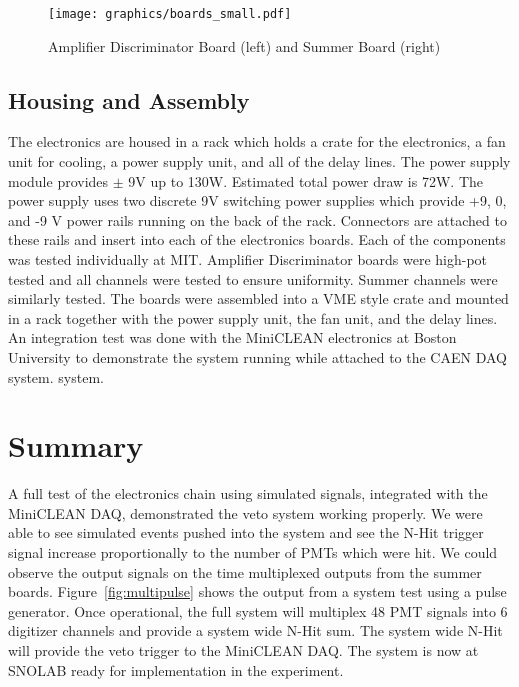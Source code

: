 \documentclass{JINST}
\begin{document}
\begin{figure}[ht]
\begin{center}
\texttt{[image: graphics/boards\_small.pdf]}
\caption{Amplifier Discriminator Board (left) and Summer Board (right)
\label{fig:boards}}
\end{center}
\end{figure}

\subsection{Housing and Assembly}
\label{sec:Housing}
%
The electronics are housed in a rack which holds a crate for the
electronics, a fan unit for cooling, a power supply unit, and all of
the delay lines.  The power supply module provides $\pm$ 9V up to
130W.  Estimated total power draw is 72W.  The power supply uses two
discrete 9V switching power supplies which provide +9, 0, and -9 V
power rails running on the back of the rack.  Connectors are attached
to these rails and insert into each of the electronics boards.  Each
of the components was tested individually at MIT.  Amplifier
Discriminator boards were high-pot tested and all channels were tested
to ensure uniformity.  Summer channels were similarly tested.  The
boards were assembled into a VME style crate and mounted in a rack
together with the power supply unit, the fan unit, and the delay
lines.  An integration test was done with the MiniCLEAN electronics
at Boston University to
demonstrate the system running while attached to the CAEN DAQ system.
system.

\section{Summary}
\label{Summary}
%
A full test of the electronics chain using simulated signals,
integrated with the MiniCLEAN DAQ, demonstrated the veto
system working properly.  We were able to see simulated events pushed
into the system and see the N-Hit trigger signal increase
proportionally to the number of PMTs which were hit.  We could observe
the output signals on the time multiplexed outputs from the summer
boards.  Figure~\ref{fig:multipulse} shows the output from a system
test using a pulse generator.  Once operational, the full system will
multiplex 48 PMT signals into 6 digitizer channels and provide a
system wide N-Hit sum.  The system wide N-Hit will provide the veto
trigger to the MiniCLEAN DAQ.  The system is now at SNOLAB ready for
implementation in the experiment.
\end{document}
